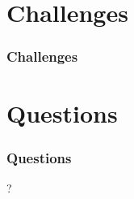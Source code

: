 \documentclass{beamer}
\begin{document}
\section{Challenges}
\begin{frame}
        \frametitle{Challenges}

\end{frame}

\section{Questions}
\begin{frame}
        \frametitle{Questions}
  \begin{center}
    ?
  \end{center}
\end{frame}
\end{document}

